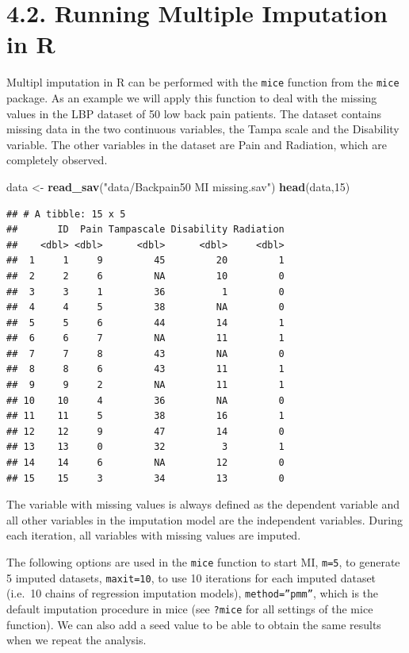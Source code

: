 \documentclass[]{book}
\newenvironment{Shaded}{\begin{snugshade}}{\end{snugshade}}
\newcommand{\KeywordTok}[1]{\textcolor[rgb]{0.13,0.29,0.53}{\textbf{#1}}}
\newcommand{\DecValTok}[1]{\textcolor[rgb]{0.00,0.00,0.81}{#1}}
\newcommand{\StringTok}[1]{\textcolor[rgb]{0.31,0.60,0.02}{#1}}
\newcommand{\NormalTok}[1]{#1}
\theoremstyle{definition}
\theoremstyle{definition}
\theoremstyle{definition}
\theoremstyle{remark}
\begin{document}
\section{4.2. Running Multiple Imputation in
R}\label{running-multiple-imputation-in-r}

Multipl imputation in R can be performed with the \texttt{mice} function
from the \texttt{mice} package. As an example we will apply this
function to deal with the missing values in the LBP dataset of 50 low
back pain patients. The dataset contains missing data in the two
continuous variables, the Tampa scale and the Disability variable. The
other variables in the dataset are Pain and Radiation, which are
completely observed.

\begin{Shaded}
\begin{Highlighting}[]
\NormalTok{data <-}\StringTok{ }\KeywordTok{read_sav}\NormalTok{(}\StringTok{"data/Backpain50 MI missing.sav"}\NormalTok{)}
\KeywordTok{head}\NormalTok{(data,}\DecValTok{15}\NormalTok{)}
\end{Highlighting}
\end{Shaded}

\begin{verbatim}
## # A tibble: 15 x 5
##       ID  Pain Tampascale Disability Radiation
##    <dbl> <dbl>      <dbl>      <dbl>     <dbl>
##  1     1     9         45         20         1
##  2     2     6         NA         10         0
##  3     3     1         36          1         0
##  4     4     5         38         NA         0
##  5     5     6         44         14         1
##  6     6     7         NA         11         1
##  7     7     8         43         NA         0
##  8     8     6         43         11         1
##  9     9     2         NA         11         1
## 10    10     4         36         NA         0
## 11    11     5         38         16         1
## 12    12     9         47         14         0
## 13    13     0         32          3         1
## 14    14     6         NA         12         0
## 15    15     3         34         13         0
\end{verbatim}

The variable with missing values is always defined as the dependent
variable and all other variables in the imputation model are the
independent variables. During each iteration, all variables with missing
values are imputed.

The following options are used in the \texttt{mice} function to start
MI, \texttt{m=5}, to generate 5 imputed datasets, \texttt{maxit=10}, to
use 10 iterations for each imputed dataset (i.e.~10 chains of regression
imputation models), \texttt{method=”pmm”}, which is the default
imputation procedure in mice (see \texttt{?mice} for all settings of the
mice function). We can also add a seed value to be able to obtain the
same results when we repeat the analysis.
\end{document}
